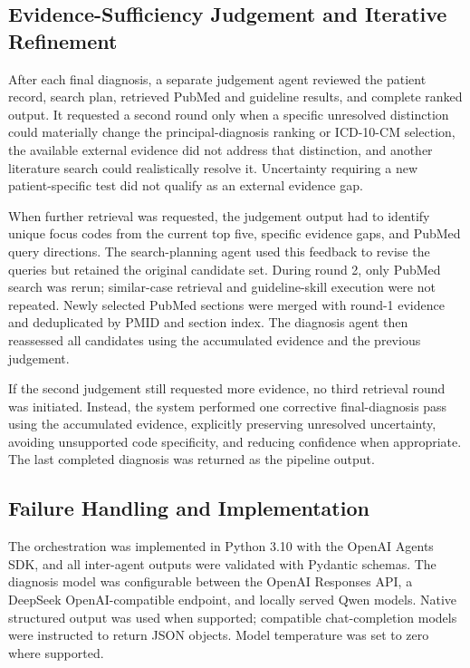 \documentclass[10pt,letterpaper]{article}
\begin{document}
\subsection{Evidence-Sufficiency Judgement and Iterative Refinement}

After each final diagnosis, a separate judgement agent reviewed the patient
record, search plan, retrieved PubMed and guideline results, and complete ranked
output. It requested a second round only when a specific unresolved distinction
could materially change the principal-diagnosis ranking or ICD-10-CM selection,
the available external evidence did not address that distinction, and another
literature search could realistically resolve it. Uncertainty requiring a new
patient-specific test did not qualify as an external evidence gap.

When further retrieval was requested, the judgement output had to identify
unique focus codes from the current top five, specific evidence gaps, and PubMed
query directions. The search-planning agent used this feedback to revise the
queries but retained the original candidate set. During round 2, only PubMed
search was rerun; similar-case retrieval and guideline-skill execution were not
repeated. Newly selected PubMed sections were merged with round-1 evidence and
deduplicated by PMID and section index. The diagnosis agent then reassessed all
candidates using the accumulated evidence and the previous judgement.

If the second judgement still requested more evidence, no third retrieval round
was initiated. Instead, the system performed one corrective final-diagnosis pass
using the accumulated evidence, explicitly preserving unresolved uncertainty,
avoiding unsupported code specificity, and reducing confidence when appropriate.
The last completed diagnosis was returned as the pipeline output.

\subsection{Failure Handling and Implementation}

The orchestration was implemented in Python 3.10 with the OpenAI Agents SDK, and
all inter-agent outputs were validated with Pydantic schemas. The diagnosis model
was configurable between the OpenAI Responses API, a DeepSeek OpenAI-compatible
endpoint, and locally served Qwen models. Native structured output was used when
supported; compatible chat-completion models were instructed to return JSON
objects. Model temperature was set to zero where supported.
\end{document}
